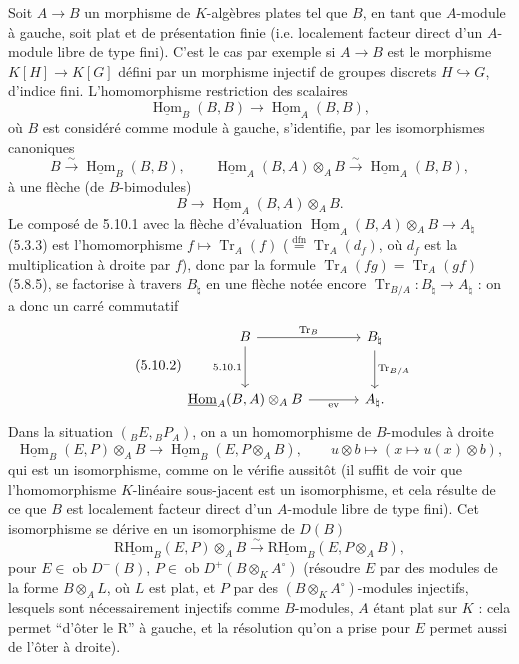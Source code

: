 \documentclass[11pt]{article}
\DeclareMathOperator{\Hom}{Hom}
\newcommand{\R}{\mathrm{R}}\newcommand{\RHomCore}{\mathrm{RHom}}
\newcommand{\ob}{\operatorname{ob}}
\providecommand{\RHom}{\RHomCore}
\providecommand{\uRHom}{\underline{\RHom}}
\providecommand{\uHom}{\underline{\Hom}}
\providecommand{\Tr}{\operatorname{Tr}}
\providecommand{\Tr}{\operatorname{Tr}}
\providecommand{\Tr}{\operatorname{Tr}}
\providecommand{\RHom}{\RHomCore}
\providecommand{\Hom}{\operatorname{Hom}}
\providecommand{\ob}{\operatorname{ob}}
\providecommand{\RHom}{\R\mathcal{H}om}
\providecommand{\R}{\mathrm R}
\providecommand{\Tr}{\operatorname{Tr}}
\providecommand{\RHom}{\RHomCore}
\providecommand{\Hom}{\operatorname{Hom}}
\providecommand{\Tr}{\operatorname{Tr}}
\begin{document}
Soit $A\to B$ un morphisme de $K$-algèbres plates tel que $B$, en tant que $A$-module à gauche, soit plat et de présentation finie (i.e. localement facteur direct d'un $A$-module libre de type fini). C'est le cas par exemple si $A\to B$ est le morphisme $K[H]\to K[G]$ défini par un morphisme injectif de groupes discrets $H\hookrightarrow G$, d'indice fini. L'homomorphisme restriction des scalaires
\[
\uHom_B(B,B)\longrightarrow\uHom_A(B,B),
\]
où $B$ est considéré comme module à gauche, s'identifie, par les isomorphismes canoniques
\[
B\xrightarrow{\sim}\uHom_B(B,B),\qquad \uHom_A(B,A)\otimes_AB\xrightarrow{\sim}\uHom_A(B,B),
\]
à une flèche (de $B$-bimodules)
\begin{equation}\tag{5.10.1}
B\longrightarrow\uHom_A(B,A)\otimes_AB.
\end{equation}
Le composé de 5.10.1 avec la flèche d'évaluation $\uHom_A(B,A)\otimes_AB\to A_\natural$ (5.3.3) est l'homomorphisme $f\mapsto\Tr_A(f)$ ($\stackrel{\mathrm{dfn}}{=}\Tr_A(d_f)$, où $d_f$ est la multiplication à droite par $f$), donc par la formule $\Tr_A(fg)=\Tr_A(gf)$ (5.8.5), se factorise à travers $B_\natural$ en une flèche notée encore $\Tr_{B/A}:B_\natural\to A_\natural$ : on a donc un carré commutatif
\begin{equation}\tag{5.10.2}
\begin{tikzcd}[column sep=large,row sep=large]
B \arrow[r,"\Tr_B"] \arrow[d,"5.10.1"'] & B_\natural \arrow[d,"\Tr_{B/A}"]\\
\uHom_A(B,A)\otimes_AB \arrow[r,"\mathrm{ev}"'] & A_\natural .
\end{tikzcd}
\end{equation}
Dans la situation $({}_BE,{}_BP_A)$, on a un homomorphisme de $B$-modules à droite
\begin{equation}\tag{5.10.3}
\uHom_B(E,P)\otimes_AB\longrightarrow\uHom_B(E,P\otimes_AB),\qquad
u\otimes b\longmapsto(x\longmapsto u(x)\otimes b),
\end{equation}
qui est un isomorphisme, comme on le vérifie aussitôt (il suffit de voir que l'homomorphisme $K$-linéaire sous-jacent est un isomorphisme, et cela résulte de ce que $B$ est localement facteur direct d'un $A$-module libre de type fini). Cet isomorphisme se dérive en un isomorphisme de $D(B)$
\begin{equation}\tag{5.10.4}
\uRHom_B(E,P)\otimes_AB\xrightarrow{\sim}\uRHom_B(E,P\otimes_AB),
\end{equation}
pour $E\in\ob D^-(B)$, $P\in\ob D^+(B\otimes_KA^\circ)$ (résoudre $E$ par des modules de la forme $B\otimes_AL$, où $L$ est plat, et $P$ par des $(B\otimes_KA^\circ)$-modules injectifs, lesquels sont nécessairement injectifs comme $B$-modules, $A$ étant plat sur $K$ : cela permet ``d'ôter le $\R$'' à gauche, et la résolution qu'on a prise pour $E$ permet aussi de l'ôter à droite).
\end{document}
